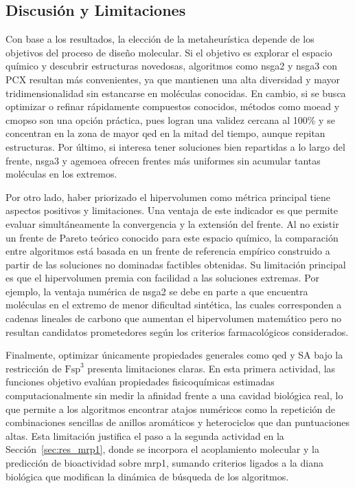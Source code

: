 \subsection{Discusión y Limitaciones}
\label{subsec:discusion_limitaciones_genericos}

Con base a los resultados, la elección de la metaheurística depende de los objetivos del proceso de diseño molecular. Si el objetivo es explorar el espacio químico y descubrir estructuras novedosas, algoritmos como \acrshort{nsga2} y \acrshort{nsga3} con PCX resultan más convenientes, ya que mantienen una alta diversidad y mayor tridimensionalidad sin estancarse en moléculas conocidas. En cambio, si se busca optimizar o refinar rápidamente compuestos conocidos, métodos como \acrshort{moead} y \acrshort{cmopso} son una opción práctica, pues logran una validez cercana al 100\% y se concentran en la zona de mayor \gls{qed} en la mitad del tiempo, aunque repitan estructuras. Por último, si interesa tener soluciones bien repartidas a lo largo del frente, \acrshort{nsga3} y \acrshort{agemoea} ofrecen frentes más uniformes sin acumular tantas moléculas en los extremos.

Por otro lado, haber priorizado el hipervolumen como métrica principal tiene aspectos positivos y limitaciones. Una ventaja de este indicador es que permite evaluar simultáneamente la convergencia y la extensión del frente. Al no existir un frente de Pareto teórico conocido para este espacio químico, la comparación entre algoritmos está basada en un frente de referencia empírico construido a partir de las soluciones no dominadas factibles obtenidas. Su limitación principal es que el hipervolumen premia con facilidad a las soluciones extremas. Por ejemplo, la ventaja numérica de \acrshort{nsga2} se debe en parte a que encuentra moléculas en el extremo de menor dificultad sintética, las cuales corresponden a cadenas lineales de carbono que aumentan el hipervolumen matemático pero no resultan candidatos prometedores según los criterios farmacológicos considerados.

Finalmente, optimizar únicamente propiedades generales como \gls{qed} y SA bajo la restricción de $\text{Fsp}^3$ presenta limitaciones claras. En esta primera actividad, las funciones objetivo evalúan propiedades fisicoquímicas estimadas computacionalmente sin medir la afinidad frente a una cavidad biológica real, lo que permite a los algoritmos encontrar atajos numéricos como la repetición de combinaciones sencillas de anillos aromáticos y heterociclos que dan puntuaciones altas. Esta limitación justifica el paso a la segunda actividad en la Sección~\ref{sec:res_mrp1}, donde se incorpora el acoplamiento molecular y la predicción de bioactividad sobre \gls{mrp1}, sumando criterios ligados a la diana biológica que modifican la dinámica de búsqueda de los algoritmos.


